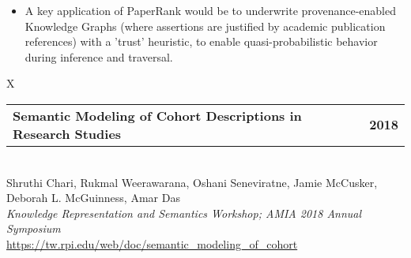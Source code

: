 \documentclass[10pt]{article}
\newcommand{\tabularxwidth}{\textwidth}
\begin{document}
\begin{minipage}{\tabularxwidth}
\begin{itemize}[noitemsep, topsep=3pt, parsep=0pt, partopsep=0pt]
                \item 
    A key application of PaperRank would be to underwrite provenance-enabled Knowledge Graphs (where assertions are justified by academic publication references) with a 'trust' heuristic, to enable quasi-probabilistic behavior during inference and traversal.
            
        \end{itemize}

        
            \vspace{.5em}
        

        \end{minipage}
    
        \begin{minipage}{\tabularxwidth}
        \begin{tabularx}{\tabularxwidth}{X}
            {
                \begin{tabularx}{\tabularxwidth}{@{}X r}
                    \textbf{Semantic Modeling of Cohort Descriptions in Research Studies} &
                    \textbf{
        2018} \\
                \end{tabularx}
            } \\
            Shruthi Chari, Rukmal Weerawarana, Oshani Seneviratne, Jamie McCusker, Deborah L. McGuinness, Amar Das \\

            
                \textit{Knowledge Representation and Semantics Workshop; AMIA 2018 Annual Symposium} \\
            
            
                \url{https://tw.rpi.edu/web/doc/semantic_modeling_of_cohort} \\
            
            
        \end{tabularx}


\end{minipage}
\end{document}

